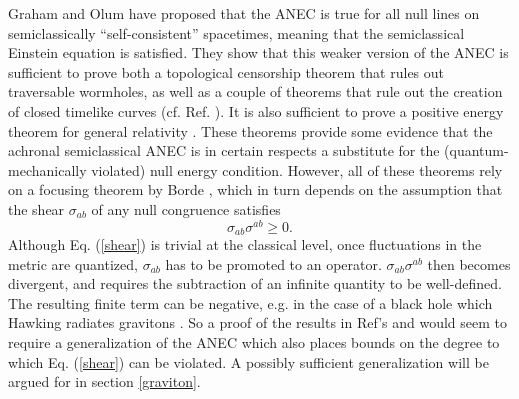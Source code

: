 \documentclass{article}
\begin{document}
Graham and Olum \cite{GO07} have proposed that the ANEC is true for all null lines on semiclassically ``self-consistent'' spacetimes, meaning that the semiclassical Einstein equation is satisfied.  They show that this weaker version of the ANEC is sufficient to prove both a topological censorship theorem that rules out traversable wormholes, as well as a couple of theorems that rule out the creation of closed timelike curves (cf. Ref. \cite{minguzzi08}).  It is also sufficient to prove a positive energy theorem for general relativity \cite{PSW93}.  These theorems provide some evidence that the achronal semiclassical ANEC is in certain respects a substitute for the (quantum-mechanically violated) null energy condition.  However, all of these theorems rely on a focusing theorem by Borde \cite{borde87}, which in turn depends on the assumption that the shear $\sigma_{ab}$ of any null congruence satisfies
\begin{equation}\label{shear}
\sigma_{ab}\sigma^{ab} \ge 0.
\end{equation}
Although Eq. (\ref{shear}) is trivial at the classical level, once fluctuations in the metric are quantized, $\sigma_{ab}$ has to be promoted to an operator.  $\sigma_{ab}\sigma^{ab}$ then becomes divergent, and requires the subtraction of an infinite quantity to be well-defined.  The resulting finite term can be negative, e.g. in the case of a black hole which Hawking radiates gravitons \cite{CS77}.  So a proof of the results in Ref's \cite{GO07} and \cite{PSW93} would seem to require a generalization of the ANEC which also places bounds on the degree to which Eq. (\ref{shear}) can be violated.  A possibly sufficient generalization will be argued for in section \ref{graviton}.
\end{document}
